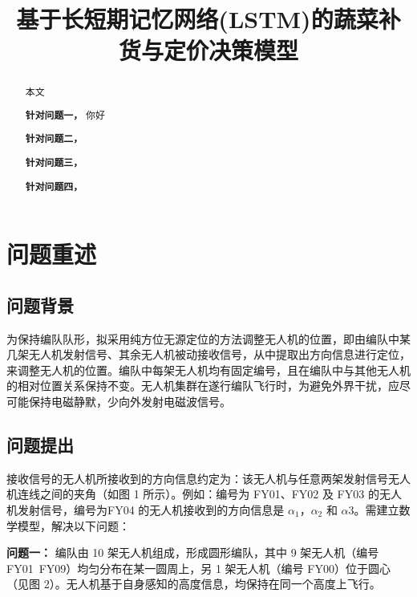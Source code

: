 \documentclass[withoutpreface,bwprint]{cumcmthesis} %
\title{基于长短期记忆网络(LSTM)的蔬菜补货与定价决策模型}
\begin{document}
\maketitle
\nocite{*}


\begin{abstract}
本文

    \textbf{针对问题一，}
你好

    \textbf{针对问题二，}

    \textbf{针对问题三，}

    \textbf{针对问题四，}

\end{abstract}

\section{问题重述}

\subsection{问题背景}
为保持编队队形，拟采用纯方位无源定位的方法调整无人机的位置，即由编队中某几架无人机发射信号、其余无人机被动接收信号，从中提取出方向信息进行定位，来调整无人机的位置。编队中每架无人机均有固定编号，且在编队中与其他无人机的相对位置关系保持不变。无人机集群在遂行编队飞行时，为避免外界干扰，应尽可能保持电磁静默，少向外发射电磁波信号。

\subsection{问题提出}
接收信号的无人机所接收到的方向信息约定为：该无人机与任意两架发射信号无人机连线之间的夹角（如图 1 所示）。例如：编号为 FY01、FY02 及 FY03 的无人机发射信号，编号为FY04 的无人机接收到的方向信息是 $\alpha_1$，$\alpha_2$ 和 $\alpha3$。需建立数学模型，解决以下问题：

\textbf{问题一：}
编队由 10 架无人机组成，形成圆形编队，其中 9 架无人机（编号 FY01~FY09）均匀分布在某一圆周上，另 1 架无人机（编号 FY00）位于圆心（见图 2）。无人机基于自身感知的高度信息，均保持在同一个高度上飞行。
\end{document}
